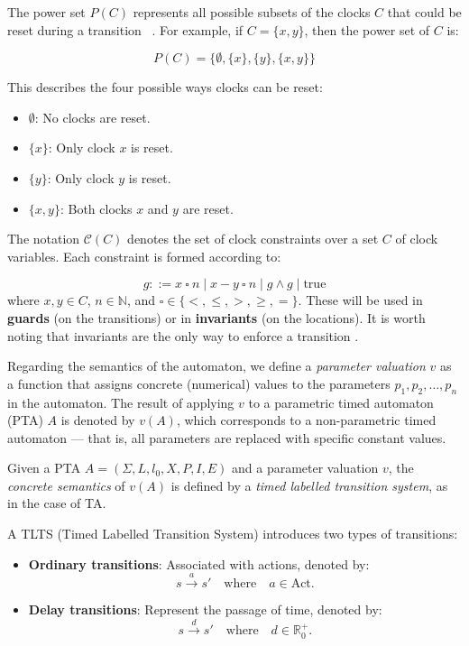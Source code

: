 The power set \( P(C) \) represents all possible subsets of the clocks \( C \) that could be reset during a transition ~\cite{baukus2002power}. For example, if \( C = \{x, y\} \), then the power set of \( C \) is:

\[
P(C) = \{\emptyset, \{x\}, \{y\}, \{x, y\}\}
\]

This describes the four possible ways clocks can be reset:

\begin{itemize}
    \item \( \emptyset \): No clocks are reset.
    \item \( \{x\} \): Only clock \( x \) is reset.
    \item \( \{y\} \): Only clock \( y \) is reset.
    \item \( \{x, y\} \): Both clocks \( x \) and \( y \) are reset.
\end{itemize} 

The notation \( \mathcal{C}(C) \) denotes the set of clock constraints over a set \( C \) of clock variables. Each constraint is formed according to:

\[
g ::= x \ \square \ n \mid x - y \ \square \ n \mid g \land g \mid \text{true}
\]
where \( x, y \in C \), \( n \in \mathbb{N} \), and \( \square \in \{ <, \leq, >, \geq, = \} \). These will be used in \textbf{guards} (on the transitions) or in \textbf{invariants} (on the locations). It is worth noting that invariants are the only way to enforce a transition \cite{proenca_slides}.

Regarding the semantics of the automaton, we define a \emph{parameter valuation} $v$ as a function that assigns concrete (numerical) values to the parameters $p_1, p_2, \ldots, p_n$ in the automaton. The result of applying $v$ to a parametric timed automaton (PTA) $A$ is denoted by $v(A)$, which corresponds to a non-parametric timed automaton --- that is, all parameters are replaced with specific constant values.

Given a PTA $A = (\Sigma, L, l_0, X, P, I, E)$ and a parameter valuation $v$, the \emph{concrete semantics} of $v(A)$ is defined by a \emph{timed labelled transition system}, as in the case of TA.


A TLTS (Timed Labelled Transition System) introduces two types of transitions:

\begin{itemize}
    \item \textbf{Ordinary transitions}: Associated with actions, denoted by:
    \[
        s \xrightarrow{a} s' \quad \text{where} \quad a \in \text{Act}.
    \]
    \item \textbf{Delay transitions}: Represent the passage of time, denoted by:
    \[
        s \xrightarrow{d} s' \quad \text{where} \quad d \in \mathbb{R}^+_0.
    \]
\end{itemize}

